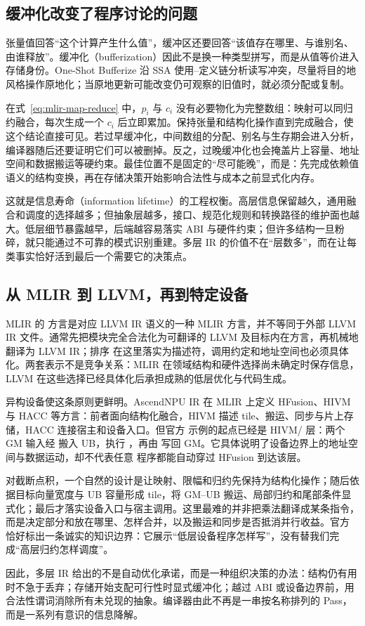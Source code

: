 \subsection{缓冲化改变了程序讨论的问题}

张量值回答“这个计算产生什么值”，缓冲区还要回答“该值存在哪里、与谁别名、由谁释放”。缓冲化（bufferization）因此不是换一种类型拼写，而是从值等价进入存储身份。One-Shot Bufferize 沿 SSA 使用--定义链分析读写冲突，尽量将目的地风格操作原地化；当原地更新可能改变仍可观察的旧值时，就必须分配或复制\cite{adv-mlir-bufferization}。

在式~\eqref{eq:mlir-map-reduce} 中，$p_i$ 与 $c_i$ 没有必要物化为完整数组：映射可以同归约融合，每次生成一个 $c_i$ 后立即累加。保持张量和结构化操作直到完成融合，使这个结论直接可见。若过早缓冲化，中间数组的分配、别名与生存期会进入分析，编译器随后还要证明它们可以被删掉。反之，过晚缓冲化也会掩盖片上容量、地址空间和数据搬运等硬约束。最佳位置不是固定的“尽可能晚”，而是：先完成依赖值语义的结构变换，再在存储决策开始影响合法性与成本之前显式化内存。

这就是信息寿命（information lifetime）的工程权衡。高层信息保留越久，通用融合和调度的选择越多；但抽象层越多，接口、规范化规则和转换路径的维护面也越大。低层细节暴露越早，后端越容易落实 ABI 与硬件约束；但许多结构一旦粉碎，就只能通过不可靠的模式识别重建。多层 IR 的价值不在“层数多”，而在让每类事实恰好活到最后一个需要它的决策点。

\subsection{从 MLIR 到 LLVM，再到特定设备}

MLIR 的  方言是对应 LLVM IR 语义的一种 MLIR 方言，并不等同于外部 LLVM IR 文件。通常先把模块完全合法化为可翻译的 LLVM 及目标内在方言，再机械地翻译为 LLVM IR；排序  在这里落实为描述符，调用约定和地址空间也必须具体化\cite{adv-mlir-llvm-dialect,adv-mlir-llvm-target}。两套表示不是竞争关系：MLIR 在领域结构和硬件选择尚未确定时保存信息，LLVM 在这些选择已经具体化后承担成熟的低层优化与代码生成。

异构设备使这条原则更鲜明。AscendNPU IR 在 MLIR 上定义 HFusion、HIVM 与 HACC 等方言：前者面向结构化融合，HIVM 描述 tile、搬运、同步与片上存储，HACC 连接宿主和设备入口\cite{adv-ascend-architecture,adv-ascend-source}。但官方  示例的起点已经是 HIVM/ 层：两个 GM 输入经  搬入 UB，执行 ，再由  写回 GM\cite{adv-ascend-vecadd}。它具体说明了设备边界上的地址空间与数据运动，却不代表任意  程序都能自动穿过 HFusion 到达该层。

对截断点积，一个自然的设计是让映射、限幅和归约先保持为结构化操作；随后依据目标向量宽度与 UB 容量形成 tile，将 GM--UB 搬运、局部归约和尾部条件显式化；最后才落实设备入口与宿主调用。这里最难的并非把乘法翻译成某条指令，而是决定部分和放在哪里、怎样合并，以及搬运和同步是否抵消并行收益。官方  恰好标出一条诚实的知识边界：它展示“低层设备程序怎样写”，没有替我们完成“高层归约怎样调度”。

因此，多层 IR 给出的不是自动优化承诺，而是一种组织决策的办法：结构仍有用时不急于丢弃；存储开始支配可行性时显式缓冲化；越过 ABI 或设备边界前，用合法性谓词消除所有未兑现的抽象。编译器由此不再是一串按名称排列的 Pass，而是一系列有意识的信息降解。
